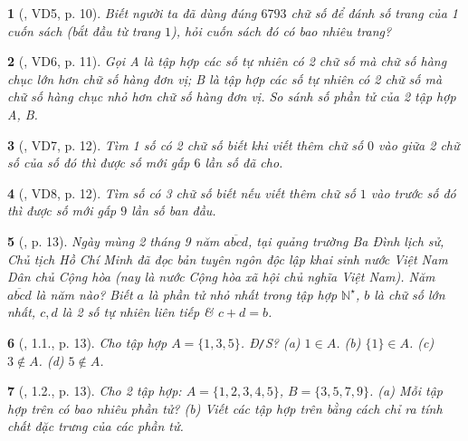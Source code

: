 \documentclass{article}
\newtheorem{baitoan}{}
\begin{document}
\begin{baitoan}[\cite{Binh_boi_duong_Toan_6_tap_1}, VD5, p. 10]
	Biết người ta đã dùng đúng $6793$ chữ số để đánh số trang của 1 cuốn sách (bắt đầu từ trang $1$), hỏi cuốn sách đó có bao nhiêu trang?
\end{baitoan}

\begin{baitoan}[\cite{Binh_boi_duong_Toan_6_tap_1}, VD6, p. 11]
	Gọi A là tập hợp các số tự nhiên có 2 chữ số mà chữ số hàng chục lớn hơn chữ số hàng đơn vị; B là tập hợp các số tự nhiên có 2 chữ số mà chữ số hàng chục nhỏ hơn chữ số hàng đơn vị. So sánh số phần tử của 2 tập hợp A, B.
\end{baitoan}

\begin{baitoan}[\cite{Binh_boi_duong_Toan_6_tap_1}, VD7, p. 12]
	Tìm 1 số có 2 chữ số biết khi viết thêm chữ số $0$ vào giữa 2 chữ số của số đó thì được số mới gấp $6$ lần số đã cho.
\end{baitoan}

\begin{baitoan}[\cite{Binh_boi_duong_Toan_6_tap_1}, VD8, p. 12]
	Tìm số có 3 chữ số biết nếu viết thêm chữ số $1$ vào trước số đó thì được số mới gấp $9$ lần số ban đầu.	
\end{baitoan}

\begin{baitoan}[\cite{Binh_boi_duong_Toan_6_tap_1}, p. 13]
	Ngày mùng 2 tháng 9 năm $\overline{abcd}$, tại quảng trường Ba Đình lịch sử, Chủ tịch Hồ Chí Minh đã đọc bản tuyên ngôn độc lập khai sinh nước Việt Nam Dân chủ Cộng hòa (nay là nước Cộng hòa xã hội chủ nghĩa Việt Nam). Năm $\overline{abcd}$ là năm nào? Biết $a$ là phần tử nhỏ nhất trong tập hợp $ \mathbb{N}^\star$, $b$ là chữ số lớn nhất, $c,d$ là 2 số tự nhiên liên tiếp \& $c + d = b$.
\end{baitoan}

\begin{baitoan}[\cite{Binh_boi_duong_Toan_6_tap_1}, 1.1., p. 13]
	Cho tập hợp $A = \{1,3,5\}$. {\rm Đ{\tt/}S?} (a) $1\in A$. (b) $\{1\}\in A$. (c) $3\notin A$. (d) $5\notin A$.
\end{baitoan}

\begin{baitoan}[\cite{Binh_boi_duong_Toan_6_tap_1}, 1.2., p. 13]
	Cho 2 tập hợp: $A = \{1,2,3,4,5\}$, $B = \{3,5,7,9\}$. (a) Mỗi tập hợp trên có bao nhiêu phần tử? (b) Viết các tập hợp trên bằng cách chỉ ra tính chất đặc trưng của các phần tử.
\end{baitoan}
\end{document}
